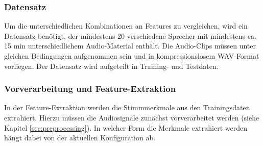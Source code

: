 



\subsubsection{Datensatz} \label{sec:KonzeptDatensatz}
Um die unterschiedlichen Kombinationen an Features zu vergleichen, wird ein Datensatz benötigt, der mindestens 20 verschiedene Sprecher mit mindestens ca. 15 min unterschiedlichem Audio-Material enthält.
Die Audio-Clips müssen unter gleichen Bedingungen aufgenommen sein und in kompressionslosem WAV-Format vorliegen.
Der Datensatz wird aufgeteilt in Training- und Testdaten.

\subsubsection{Vorverarbeitung und Feature-Extraktion}

In der Feature-Extraktion werden die Stimmmerkmale aus den Trainingsdaten extrahiert.
Hierzu müssen die Audiosignale zunächst vorverarbeitet werden (siehe Kapitel \ref{sec:preprocessing}).
In welcher Form die Merkmale extrahiert werden hängt dabei von der aktuellen Konfiguration ab.

